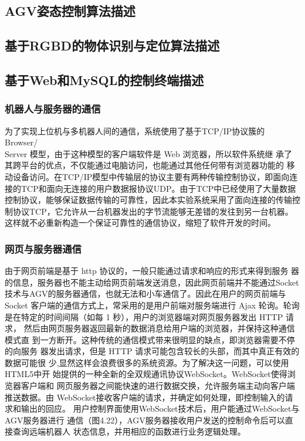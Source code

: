 \documentclass[cs4size,a4paper]{ctexart}
\numberwithin{equation}{section}
\numberwithin{table}{section}
\numberwithin{figure}{section}
\begin{document}
\subsection{AGV姿态控制算法描述}

\subsection{基于RGBD的物体识别与定位算法描述}

\subsection{基于Web和MySQL的控制终端描述}
\subsubsection{机器人与服务器的通信}
为了实现上位机与多机器人间的通信，系统使用了基于TCP/IP协议簇的 Browser/ \\Server 模型，由于这种模型的客户端软件是 Web 浏览器，所以软件系统继 承了其跨平台的优点，不仅能通过电脑访问，也能通过其他任何带有浏览器功能的 移动设备访问。在TCP/IP模型中传输层的协议主要有两种传输控制协议，即面向连 接的TCP和面向无连接的用户数据报协议UDP。由于TCP中已经使用了大量数据 控制协议，能够保证数据传输的可靠性，因此本实验系统采用了面向连接的传输控 制协议TCP，它允许从一台机器发出的字节流能够无差错的发往到另一台机器。这样就不必重新构造一个保证可靠性的通信协议，缩短了软件开发的时间。

\subsubsection{网页与服务器通信}
由于网页前端是基于 http 协议的，一般只能通过请求和响应的形式来得到服务 器的信息，服务器也不能主动给网页前端发送消息，因此网页前端并不能通过Socket 技术与AGV的服务器通信，也就无法和小车通信了。因此在用户的网页前端与 Socket 客户端的通信方式上，常采用的是用户前端对服务端进行 Ajax 轮询。轮询 是在特定的时间间隔（如每 1 秒），用户的浏览器端对网页服务器发出 HTTP 请求， 然后由网页服务器返回最新的数据消息给用户端的浏览器，并保持这种通信模式直 到一方断开。这种传统的通信模式带来很明显的缺点，即浏览器需要不停的向服务 器发出请求，但是 HTTP 请求可能包含较长的头部，而其中真正有效的数据可能很 少,显然这样会浪费很多的系统资源。为了解决这一问题，可以使用HTML5中开 始提供的一种全新的全双规通讯协议WebSocket。WebSocket使得浏览器客户端和 网页服务器之间能快速的进行数据交换，允许服务端主动向客户端推送数据。由 WebSocket接收客户端的请求，并确定如何处理，即控制输入的请求和输出的回应。 用户控制界面使用WebSocket技术后，用户能通过WebSocket与AGV服务器进行 通信（图4.22），AGV服务器接收用户发送的控制命令后可以直接查询远端机器人 状态信息，并用相应的函数进行业务逻辑处理。
\end{document}
